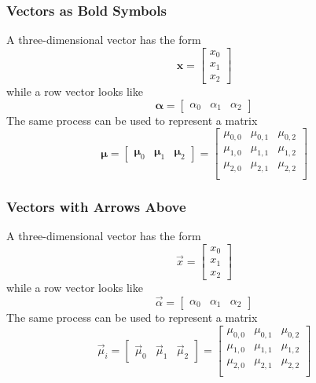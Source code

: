 \subsubsection{Vectors as Bold Symbols}\label{sec:VectorsBoldSymbols}
A three-dimensional vector has the form
\begin{equation}
	\bm{x}
	=\begin{bmatrix}
		x_0 \\ x_1 \\ x_2
	\end{bmatrix}
\end{equation}
while a row vector looks like
\begin{equation}
	\bm{\alpha}
	=\begin{bmatrix}
		\alpha_0 & \alpha_1 & \alpha_2
	\end{bmatrix}
\end{equation}
The same process can be used to represent a matrix
\begin{equation}
	\bm{\mu}
	=\begin{bmatrix}
		\bm{\mu}_0 & \bm{\mu}_1 & \bm{\mu}_{2}
	\end{bmatrix}
	=\begin{bmatrix}
		\mu_{0,0} & \mu_{0,1} & \mu_{0,2} \\
		\mu_{1,0} & \mu_{1,1} & \mu_{1,2} \\
		\mu_{2,0} & \mu_{2,1} & \mu_{2,2} \\
	\end{bmatrix}
\end{equation}

\subsubsection{Vectors with Arrows Above}
A three-dimensional vector has the form
\begin{equation}
	\vec{x}
	=\begin{bmatrix}
		x_0 \\ x_1 \\ x_2
	\end{bmatrix}
\end{equation}
while a row vector looks like
\begin{equation}
	\vec{\alpha}
	=\begin{bmatrix}
		\alpha_0 & \alpha_1 & \alpha_2
	\end{bmatrix}
\end{equation}
The same process can be used to represent a matrix
\begin{equation}
	\vec{\mu}_i
	=\begin{bmatrix}
		\vec{\mu}_0 & \vec{\mu}_1 & \vec{\mu}_{2}
	\end{bmatrix}
	=\begin{bmatrix}
		\mu_{0,0} & \mu_{0,1} & \mu_{0,2} \\
		\mu_{1,0} & \mu_{1,1} & \mu_{1,2} \\
		\mu_{2,0} & \mu_{2,1} & \mu_{2,2} \\
	\end{bmatrix}
\end{equation}

